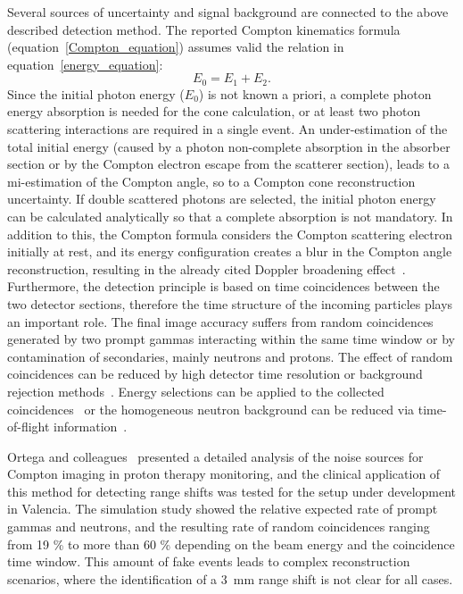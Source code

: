 Several sources of uncertainty and signal background are connected to the above described detection method. The reported Compton kinematics formula (equation~\ref{Compton_equation}) assumes valid the relation in equation~\ref{energy_equation}:
 \begin{equation}
E_{0} = E_{1}+E_{2}.
\label{energy_equation}
\end{equation} 
Since the initial photon energy (\(E_{0}\)) is not known a priori, a complete photon energy absorption is needed for the cone calculation, or at least two photon scattering interactions are required in a single event. An under-estimation of the total initial energy (caused by a photon non-complete absorption in the absorber section or by the Compton electron escape from the scatterer section), leads to a mi-estimation of the Compton angle, so to a Compton cone reconstruction uncertainty. If double scattered photons are selected, the initial photon energy can be calculated analytically so that a complete absorption is not mandatory. In addition to this, the Compton formula considers the Compton scattering electron initially at rest, and its energy configuration creates a blur in the Compton angle reconstruction, resulting in the already cited Doppler broadening effect~\cite{Doppler}. Furthermore, the detection principle is based on time coincidences between the two detector sections, therefore the time structure of the incoming particles plays an important role. The final image accuracy suffers from random coincidences generated by two prompt gammas interacting within the same time window or by contamination of secondaries, mainly neutrons and protons. The effect of random coincidences can be reduced by high detector time resolution or background rejection methods~\cite{Draeger:2017aa}. Energy selections can be applied to the collected coincidences~\cite{Polf:2009aa, Hilaire:2016aa} or the homogeneous neutron background can be reduced via time-of-flight information~\cite{Testa:2010aa}.

Ortega and colleagues~\cite{Ortega:2015aa} presented a detailed analysis of the noise sources for Compton imaging in proton therapy monitoring, and the clinical application of this method for detecting range shifts was tested for the setup under development in Valencia. The simulation study showed the relative expected rate of prompt gammas and neutrons, and the resulting rate of random coincidences ranging from 19 \% to more than 60 \% depending on the beam energy and the coincidence time window. This amount of fake events leads to complex reconstruction scenarios, where the identification of a 3~mm range shift is not clear for all cases.

